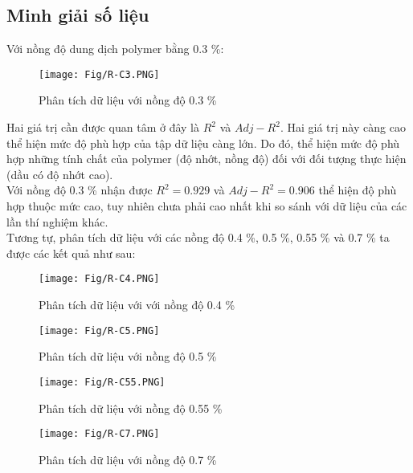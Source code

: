 \documentclass[12pt,a4paper]{article}
\begin{document}
	\subsection{Minh giải số liệu}
	Với nồng độ dung dịch polymer bằng 0.3 \%:
		\begin{figure}[h]
			\centering
			\texttt{[image: Fig/R-C3.PNG]}
			\caption{Phân tích dữ liệu với nồng độ 0.3 \%}
		\end{figure}
		\newline
	Hai giá trị cần được quan tâm ở đây là $R^2$ và $Adj-R^2$. Hai giá trị này càng cao thể hiện mức độ phù hợp của tập dữ liệu càng lớn. Do đó, thể hiện mức độ phù hợp những tính chất của polymer (độ nhớt, nồng độ) đối với đối tượng thực hiện (dầu có độ nhớt cao).\\
	Với nồng độ 0.3 \% nhận được $R^2=0.929$ và $Adj-R^2=0.906$ thể hiện độ phù hợp thuộc mức cao, tuy nhiên chưa phải cao nhất khi so sánh với dữ liệu của các lần thí nghiệm khác.\\
	Tương tự, phân tích dữ liệu với các nồng độ 0.4 \%, 0.5 \%, 0.55 \% và 0.7 \% ta được các kết quả như sau:
		\begin{figure}[h]
			\centering
			\texttt{[image: Fig/R-C4.PNG]}
			\caption{Phân tích dữ liệu với với nồng độ 0.4 \%}
		\end{figure}
		\begin{figure}[h]
			\centering
			\texttt{[image: Fig/R-C5.PNG]}
			\caption{Phân tích dữ liệu với nồng độ 0.5 \%}
		\end{figure}
		\begin{figure}[h]
			\centering
			\texttt{[image: Fig/R-C55.PNG]}
			\caption{Phân tích dữ liệu với nồng độ 0.55 \%}
		\end{figure}
		\begin{figure}[h]
			\centering
			\texttt{[image: Fig/R-C7.PNG]}
			\caption{Phân tích dữ liệu với nồng độ 0.7 \%}
		\end{figure}
		\clearpage
\end{document}
